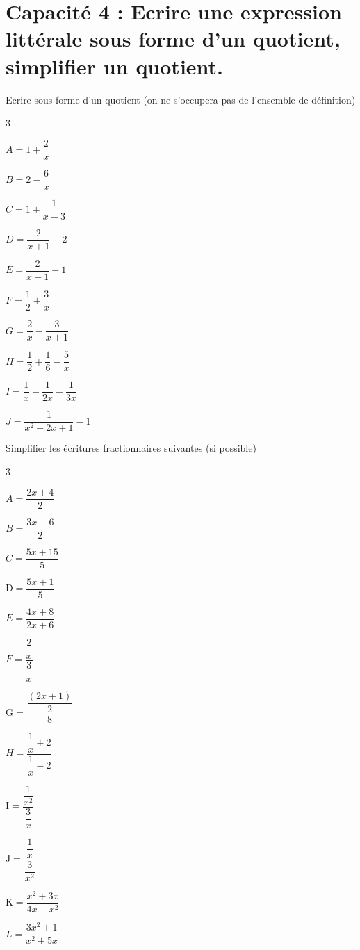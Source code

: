 \documentclass[10pt,a4paper]{article}  %
\begin{document}
\section*{Capacité 4 : Ecrire une expression littérale sous forme d'un quotient, simplifier un quotient.}
\vspace*{-0.8cm}
\exerciceDS{}
Ecrire sous forme d'un quotient (on ne s'occupera pas de l'ensemble de définition)
\begin{multicols}{3}
	\begin{enumMet}
		\item $A=1+\dfrac{2}{x}$
		\item $B=2-\dfrac{6}{x}$
		\item $C=1+\dfrac{1}{x-3}$
		\item $D=\dfrac{2}{x+1}-2$
		\item $E=\dfrac{2}{x+1}-1$
		\item $F=\dfrac{1}{2}+\dfrac{3}{x}$
		\item $G=\dfrac{2}{x}-\dfrac{3}{x+1}$
		\item $H=\dfrac{1}{2}+\dfrac{1}{6}-\dfrac{5}{x}$
		\item $I=\dfrac{1}{x}-\dfrac{1}{2 x}-\dfrac{1}{3 x}$
		\item $J=\dfrac{1}{x^{2}-2 x+1}-1$
	\end{enumMet}
\end{multicols}
\vspace*{-0.8cm}
\exerciceDS{}
Simplifier les écritures fractionnaires suivantes (si possible)
\begin{multicols}{3}
	\begin{enumMet}
	\item $A=\dfrac{2 x+4}{2}$
	\item $B=\dfrac{3 x-6}{2}$
	\item $C=\dfrac{5 x+15}{5}$
	\item $\mathrm{D}=\dfrac{5 x+1}{5}$
	\item $E=\dfrac{4 x+8}{2 x+6}$
	\item $F=\dfrac{\dfrac{2}{x}}{\dfrac{3}{x}}$
	\item $\mathrm{G}=\dfrac{\dfrac{(2 x+1)}{2}}{8}$
	\item $H=\dfrac{\dfrac{1}{x}+2}{\dfrac{1}{x}-2}$
	\item $\mathrm{I}=\dfrac{\dfrac{1}{x^{2}}}{\dfrac{3}{x}}$
	\item $\mathrm{J}=\dfrac{\dfrac{1}{x}}{\dfrac{3}{x^{2}}}$
	\item $\mathrm{K}=\dfrac{x^{2}+3 x}{4 x-x^{2}}$
	\item $L=\dfrac{3 x^{2}+1}{x^{2}+5 x}$
\end{enumMet}
\end{multicols}
\vspace*{-0.8cm}
\end{document}
